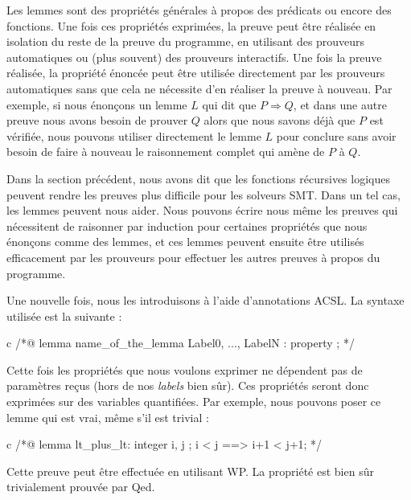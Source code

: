 
Les lemmes sont des propriétés générales à propos des prédicats ou encore des
fonctions. Une fois ces propriétés exprimées, la preuve peut être réalisée en
isolation du reste de la preuve du programme, en utilisant des prouveurs
automatiques ou (plus souvent) des prouveurs interactifs. Une fois la preuve
réalisée, la propriété énoncée peut être utilisée directement par les prouveurs
automatiques sans que cela ne nécessite d'en réaliser la preuve à nouveau. Par
exemple, si nous énonçons un lemme $L$ qui dit que $P \Rightarrow Q$, et dans
une autre preuve nous avons besoin de prouver $Q$ alors que nous savons déjà
que $P$ est vérifiée, nous pouvons utiliser directement le lemme $L$ pour
conclure sans avoir besoin de faire à nouveau le raisonnement complet qui
amène de $P$ à $Q$.



Dans la section précédent, nous avons dit que les fonctions récursives logiques
peuvent rendre les preuves plus difficile pour les solveurs SMT. Dans un tel cas,
les lemmes peuvent nous aider. Nous pouvons écrire nous même les preuves qui
nécessitent de raisonner par induction pour certaines propriétés que nous
énonçons comme des lemmes, et ces lemmes peuvent ensuite être utilisés
efficacement par les prouveurs pour effectuer les autres preuves à propos du
programme.




Une nouvelle fois, nous les introduisons à l'aide d'annotations ACSL. La syntaxe
utilisée est la suivante :



\begin{CodeBlock}{c}
/*@
  lemma name_of_the_lemma { Label0, ..., LabelN }:
    property ;
*/
\end{CodeBlock}



Cette fois les propriétés que nous voulons exprimer ne dépendent pas de
paramètres reçus (hors de nos \textit{labels} bien sûr). Ces propriétés seront donc
exprimées sur des variables quantifiées. Par exemple, nous pouvons poser ce
lemme qui est vrai, même s'il est trivial :



\begin{CodeBlock}{c}
/*@
  lemma lt_plus_lt:
    \forall integer i, j ; i < j ==> i+1 < j+1;
*/
\end{CodeBlock}



Cette preuve peut être effectuée en utilisant WP. La propriété est bien sûr
trivialement prouvée par Qed.



